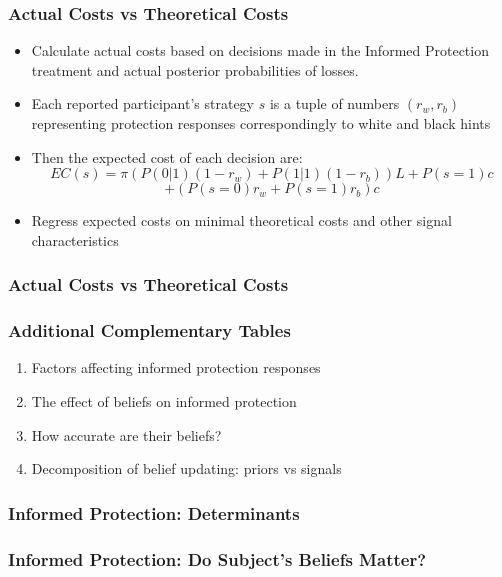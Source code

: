 \documentclass[11pt,hyperref={bookmarks=false}]{beamer}
\begin{document}
\begin{frame}
\frametitle{Actual Costs vs Theoretical Costs}
\begin{itemize}
\item Calculate actual costs based on decisions made in the Informed Protection treatment and actual posterior probabilities of losses.
\item Each reported participant's strategy $s$ is a tuple of numbers $(r_w,r_b)$ representing protection responses correspondingly to white and black hints
\item Then the expected cost of each decision are:
\small
$$EC(s)=\pi (P(0|1)(1-r_w)+P(1|1)(1-r_b))L+P(s=1)c$$
$$+(P(s=0)r_w+P(s=1)r_b)c$$
\normalsize
\item Regress expected costs on minimal theoretical costs and other signal characteristics
\end{itemize}
\end{frame}


\begin{frame}
\frametitle{Actual Costs vs Theoretical Costs}
\footnotesize

\end{frame}


\begin{frame}
\frametitle{Additional Complementary Tables}
\begin{enumerate}
\item Factors affecting informed protection responses
\item The effect of beliefs on informed protection
\item How accurate are their beliefs?
\item Decomposition of belief updating: priors vs signals
\end{enumerate}
\end{frame}



\begin{frame}
\frametitle{Informed Protection: Determinants}
\footnotesize


\end{frame}


\begin{frame}
\frametitle{Informed Protection: Do Subject's Beliefs Matter?}

\end{frame}
\end{document}
